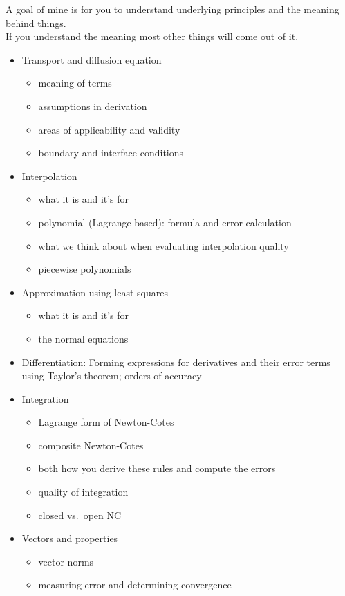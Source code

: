 \documentclass[12pt]{article}
\begin{document}
A goal of mine is for you to understand underlying principles and the meaning behind things. \\
If you understand the meaning most other things will come out of it.
\begin{itemize}
\item Transport and diffusion equation
  \begin{itemize}
  \item meaning of terms
  \item assumptions in derivation
  \item areas of applicability and validity
  \item boundary and interface conditions
  \end{itemize}

\item Interpolation 
  \begin{itemize}
  \item what it is and it's for  
  \item polynomial (Lagrange based): formula and error calculation 
  \item what we think about when evaluating interpolation quality
  \item piecewise polynomials
  \end{itemize}

\item Approximation using least squares
  \begin{itemize}
  \item what it is and it's for  
  \item the normal equations
  \end{itemize}

\item Differentiation: Forming expressions for derivatives and their error terms using Taylor's theorem; orders of accuracy

\item Integration
  \begin{itemize}
  \item Lagrange form of Newton-Cotes
  \item composite Newton-Cotes
  \item both how you derive these rules and compute the errors
  \item quality of integration
  \item closed vs.\ open NC
  \end{itemize}

\item Vectors and properties
  \begin{itemize}
  \item vector norms
  \item measuring error and determining convergence
  \end{itemize}


\end{itemize}
\end{document}
